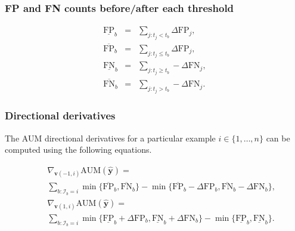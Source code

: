 \documentclass{beamer}
\begin{document}
\begin{frame}
  \frametitle{FP and FN counts before/after each threshold}
  

\begin{eqnarray*}
  \underline{\text{FP}}_b &=& \sum_{j: t_j < t_b} \Delta\text{FP}_j,\label{eq:first-fp-fn-over-under} \\
  \overline{\text{FP}}_b &=& \sum_{j: t_j \leq t_b} \Delta\text{FP}_j, \\
  \underline{\text{FN}}_b &=& \sum_{j: t_j \geq t_b} - \Delta\text{FN}_j, \\
  \overline{\text{FN}}_b &=& \sum_{j: t_j > t_b} - \Delta\text{FN}_j.\label{eq:last-fp-fn-over-under}
\end{eqnarray*}

\end{frame}

\begin{frame}
  \frametitle{Directional derivatives}

\begin{theorem}
\label{thm:directional-derivs}
The AUM directional derivatives for a particular example
$i\in\{1,\dots,n\}$ can be computed using the following equations.
\end{theorem}
\begin{eqnarray*}
  &&\nabla_{\mathbf v(-1,i)} \text{AUM}(\mathbf{\hat y}) = \\
  &&\sum_{b: \mathcal I_b = i}
  \min\{
  \overline{\text{FP}}_b , 
  \overline{\text{FN}}_b 
  \}
  -
  \min\{
  \overline{\text{FP}}_b - \Delta\text{FP}_b, 
  \overline{\text{FN}}_b - \Delta\text{FN}_b
  \},\\
  &&\nabla_{\mathbf v(1,i)} \text{AUM}(\mathbf{\hat y}) = \\
  &&\sum_{b: \mathcal I_b = i}
  \min\{
  \underline{\text{FP}}_b + \Delta\text{FP}_b, 
  \underline{\text{FN}}_b + \Delta\text{FN}_b
  \}
  -
  \min\{
  \underline{\text{FP}}_b , 
  \underline{\text{FN}}_b 
  \}.
\end{eqnarray*}  
\end{frame}
\end{document}
